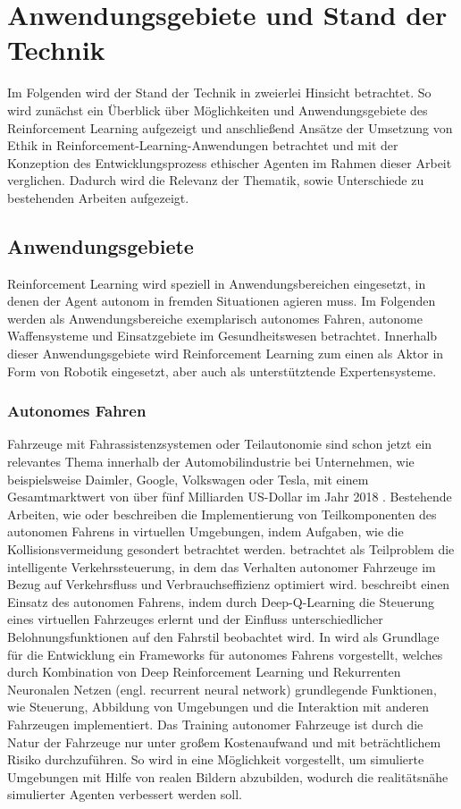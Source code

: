\section{Anwendungsgebiete und Stand der Technik}\label{sec:stand_der_technik}
Im Folgenden wird der Stand der Technik in zweierlei Hinsicht betrachtet.
So wird zunächst ein Überblick über Möglichkeiten und Anwendungsgebiete des Reinforcement Learning aufgezeigt und anschließend Ansätze der Umsetzung von Ethik in Reinforcement-Learning-Anwendungen betrachtet und mit der Konzeption des Entwicklungsprozess ethischer Agenten im Rahmen dieser Arbeit verglichen.
Dadurch wird die Relevanz der Thematik, sowie Unterschiede zu bestehenden Arbeiten aufgezeigt.

\subsection{Anwendungsgebiete}
Reinforcement Learning wird speziell in Anwendungsbereichen eingesetzt, in denen der Agent autonom in fremden Situationen agieren muss.
Im Folgenden werden als Anwendungsbereiche exemplarisch autonomes Fahren, autonome Waffensysteme und Einsatzgebiete im Gesundheitswesen betrachtet.
Innerhalb dieser Anwendungsgebiete wird Reinforcement Learning zum einen als Aktor in Form von Robotik eingesetzt, aber auch als unterstütztende Expertensysteme.

\subsubsection{Autonomes Fahren}
Fahrzeuge mit Fahrassistenzsystemen oder Teilautonomie sind schon jetzt ein relevantes Thema innerhalb der Automobilindustrie bei Unternehmen, wie beispielsweise Daimler, Google, Volkswagen oder Tesla, mit einem Gesamtmarktwert von über fünf Milliarden US-Dollar im Jahr 2018 \cite{businesswire2019}.
Bestehende Arbeiten, wie \cite{arvind2019} oder \cite{niu2009} beschreiben die Implementierung von Teilkomponenten des autonomen Fahrens in virtuellen Umgebungen, indem Aufgaben, wie die Kollisionsvermeidung gesondert betrachtet werden.
\cite{you2019} betrachtet als Teilproblem die intelligente Verkehrssteuerung, in dem das Verhalten autonomer Fahrzeuge im Bezug auf Verkehrsfluss und Verbrauchseffizienz optimiert wird.
\cite{yu} beschreibt einen Einsatz des autonomen Fahrens, indem durch Deep-Q-Learning die Steuerung eines virtuellen Fahrzeuges erlernt und der Einfluss unterschiedlicher Belohnungsfunktionen auf den Fahrstil beobachtet wird.
In \cite{sallab2017} wird als Grundlage für die Entwicklung ein Frameworks für autonomes Fahrens vorgestellt, welches durch Kombination von Deep Reinforcement Learning und Rekurrenten Neuronalen Netzen (engl. recurrent neural network) grundlegende Funktionen, wie Steuerung, Abbildung von Umgebungen und die Interaktion mit anderen Fahrzeugen implementiert.
Das Training autonomer Fahrzeuge ist durch die Natur der Fahrzeuge nur unter großem Kostenaufwand und mit beträchtlichem Risiko durchzuführen.
So wird in \cite{pan2017} eine Möglichkeit vorgestellt, um simulierte Umgebungen mit Hilfe von realen Bildern abzubilden, wodurch die realitätsnähe simulierter Agenten verbessert werden soll.

